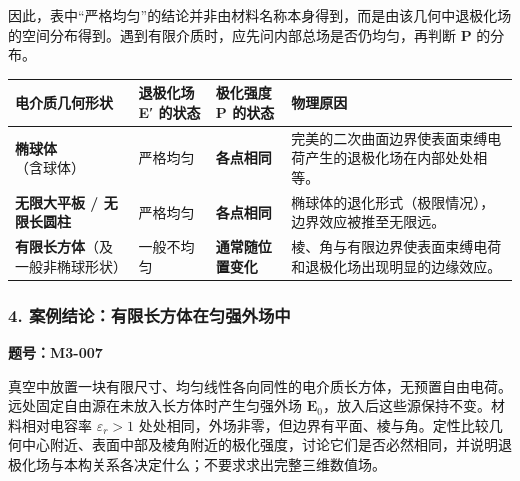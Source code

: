 因此，表中``严格均匀''的结论并非由材料名称本身得到，而是由该几何中退极化场的空间分布得到。遇到有限介质时，应先问内部总场是否仍均匀，再判断
\(\mathbf P\) 的分布。

{\def\LTcaptype{none} %
\begin{longtable}[]{@{}
  >{\raggedright\arraybackslash}p{}
  >{\raggedright\arraybackslash}p{}
  >{\raggedright\arraybackslash}p{}
  >{\raggedright\arraybackslash}p{}@{}}
\toprule\noalign{}
\begin{minipage}[b]{\linewidth}\raggedright
\textbf{电介质几何形状}
\end{minipage} & \begin{minipage}[b]{\linewidth}\raggedright
\textbf{退极化场 E′ 的状态}
\end{minipage} & \begin{minipage}[b]{\linewidth}\raggedright
\textbf{极化强度 P 的状态}
\end{minipage} & \begin{minipage}[b]{\linewidth}\raggedright
\textbf{物理原因}
\end{minipage} \\
\midrule\noalign{}
\endhead
\bottomrule\noalign{}
\endlastfoot
\textbf{椭球体}（含球体） & 严格均匀 & \textbf{各点相同} &
完美的二次曲面边界使表面束缚电荷产生的退极化场在内部处处相等。 \\
\textbf{无限大平板 / 无限长圆柱} & 严格均匀 & \textbf{各点相同} &
椭球体的退化形式（极限情况），边界效应被推至无限远。 \\
\textbf{有限长方体}（及一般非椭球形状） & 一般不均匀 &
\textbf{通常随位置变化} &
棱、角与有限边界使表面束缚电荷和退极化场出现明显的边缘效应。 \\
\end{longtable}
}

\subsubsection{4.
案例结论：有限长方体在匀强外场中}\label{m3:ux6848ux4f8bux7ed3ux8bbaux6709ux9650ux957fux65b9ux4f53ux5728ux5300ux5f3aux5916ux573aux4e2d}

\textbf{题号：M3-007}

真空中放置一块有限尺寸、均匀线性各向同性的电介质长方体，无预置自由电荷。远处固定自由源在未放入长方体时产生匀强外场
\(\mathbf E_0\)，放入后这些源保持不变。材料相对电容率
\(\varepsilon_r>1\)
处处相同，外场非零，但边界有平面、棱与角。定性比较几何中心附近、表面中部及棱角附近的极化强度，讨论它们是否必然相同，并说明退极化场与本构关系各决定什么；不要求求出完整三维数值场。


